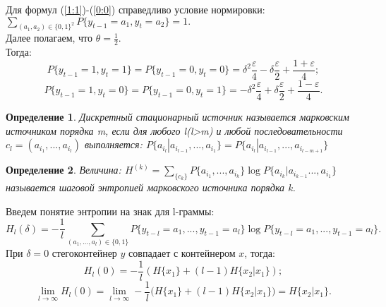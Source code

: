 \documentclass[a4paper,12pt]{article}
\theoremstyle{plain}
\newtheorem{definition}{Определение}[section]
\begin{document}
Для формул (\ref{1:1})-(\ref{0:0}) справедливо условие нормировки:\\
$ \sum_{(a_1, a_2)\in \{0, 1\}^2}P\{y_{t-1}=a_1, y_t=a_2\} =1.$\\
Далее полагаем, что $\theta=\frac{1}{2}$.\\
Тогда: 
\begin{equation}
P\{y_{t-1}=1, y_t = 1 \}=P\{y_{t-1}=0, y_t = 0 \}= \delta^2\frac{\varepsilon}{4}-\delta\frac{\varepsilon}{2}+\frac{1+\varepsilon}{4};
\end{equation}
\begin{equation}
P\{y_{t-1}=1, y_t = 0 \}=P\{y_{t-1}=0, y_t = 1 \}= -\delta^2\frac{\varepsilon}{4}+\delta\frac{\varepsilon}{2}+\frac{1-\varepsilon}{4}.
\end{equation}
\begin{definition}
	\cite{duhin} Дискретный стационарный источник называется марковским источником порядка m, если для любого l(l>m) и любой последовательности $c_l=(a_{i_1}, ..., a_{i_l})$ выполняется: $P\{a_{i_l}|a_{i_{l-1}}, ..., a_{i_1}\} = P\{a_{i_l}|a_{i_{l-1}}, ..., a_{i_{l-m+1}}\}$
\end{definition}
\begin{definition}
	\cite{duhin} Величина: 
	$H^{(k)} = \sum_{\{c_k\}}P\{a_{i_1}, ..., a_{i_k}\} \log{P\{a_{i_k}|a_{i_{k-1}} ..., a_{i_1}\} }$ называется шаговой энтропией марковского источника порядка k.
\end{definition}

Введем понятие энтропии на знак для l-граммы:\\
\begin{equation}
	\label{entropy L}
	H_l(\delta) = -\frac{1}{l} \sum_{(a_1, ..., a_l)\in \{0, 1\}}P\{y_{t-l}=a_1,..., y_{t-1}=a_l\}\log{P\{y_{t-l}=a_1, ..., y_{t-1}=a_l\}}.
\end{equation}
При $\delta = 0$ стегоконтейнер $y$ совпадает с контейнером $x$, тогда:\\
\begin{equation}
	H_l(0)=-\frac{1}{l}(H\{x_1\}+(l-1)H\{x_2|x_1\});
\end{equation}
\begin{equation}
\lim_{l \to \infty}H_l(0)= \lim_{l \to \infty}-\frac{1}{l}(H\{x_1\}+(l-1)H\{x_2|x_1\}) = H\{x_2|x_1\}.
\end{equation}
\end{document}

